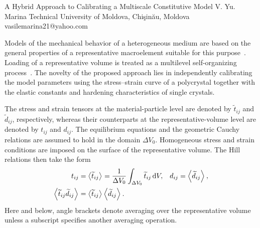 \ReportHeading
  {A Hybrid Approach to Calibrating a Multiscale Constitutive Model}
  {V. Yu. Marina}
  {Technical University of Moldova, Chi\c{s}in\u{a}u, Moldova}
  {vasilemarina21@yahoo.com}

Models of the mechanical behavior of a heterogeneous medium are based on the general properties of a representative macroelement suitable for this purpose~\cite{shevchenko1976,shevchenko1992,marina2024}. Loading of a representative volume is treated as a multilevel self-organizing process~\cite{marina2024,marina1997}. The novelty of the proposed approach lies in independently calibrating the model parameters using the stress--strain curve of a polycrystal together with the elastic constants and hardening characteristics of single crystals.

The stress and strain tensors at the material-particle level are denoted by $\widetilde t_{ij}$ and $\widetilde d_{ij}$, respectively, whereas their counterparts at the representative-volume level are denoted by $t_{ij}$ and $d_{ij}$. The equilibrium equations and the geometric Cauchy relations are assumed to hold in the domain $\Delta V_0$. Homogeneous stress and strain conditions are imposed on the surface of the representative volume. The Hill relations then take the form
\begin{equation}
\begin{aligned}
 t_{ij}&=\left\langle \widetilde t_{ij}\right\rangle_{}
       =\frac{1}{\Delta V_0}\int_{\Delta V_0}\widetilde t_{ij}\,\mathrm{d} V,
 & d_{ij}&=\left\langle \widetilde d_{ij}\right\rangle_{},\\
 \left\langle \widetilde t_{ij}\widetilde d_{ij}\right\rangle_{}
       &=\left\langle \widetilde t_{ij}\right\rangle_{}\left\langle \widetilde d_{ij}\right\rangle_{}.
\end{aligned}
\end{equation}
Here and below, angle brackets denote averaging over the representative volume unless a subscript specifies another averaging operation.

